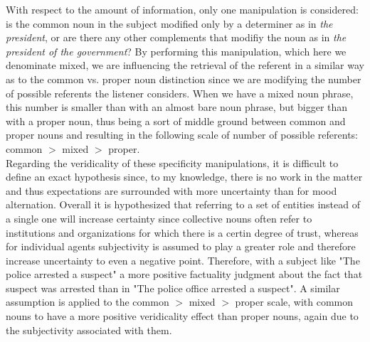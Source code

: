 With respect to the amount of information, only one manipulation is considered: is the common noun in the subject modified only by a determiner as in \textit{the president}, or are there any other complements that modifiy the noun as in \textit{the president of the government}? By performing this manipulation, which here we denominate mixed, we are influencing the retrieval of the referent in a similar way as to the common vs. proper noun distinction since we are modifying the number of possible referents the listener considers. When we have a mixed noun phrase, this number is smaller than with an almost bare noun phrase, but bigger than with a proper noun, thus being a sort of middle ground between common and proper nouns and resulting in the following scale of number of possible referents: common $>$ mixed $>$ proper.\\ 

Regarding the veridicality of these specificity manipulations, it is difficult to define an exact hypothesis since, to my knowledge, there is no work in the matter and thus expectations are surrounded with more uncertainty than for mood alternation. Overall it is hypothesized that referring to a set of entities instead of a single one will increase certainty since collective nouns often refer to institutions and organizations for which there is a certin degree of trust, whereas for individual agents subjectivity is assumed to play a greater role and therefore increase uncertainty to even a negative point. Therefore, with a subject like "The police arrested a suspect" a more positive factuality judgment about the fact that suspect was arrested than in "The police office arrested a suspect". A similar assumption is applied to the common $>$ mixed $>$ proper scale, with common nouns to have a more positive veridicality effect than proper nouns, again due to the subjectivity associated with them.\\